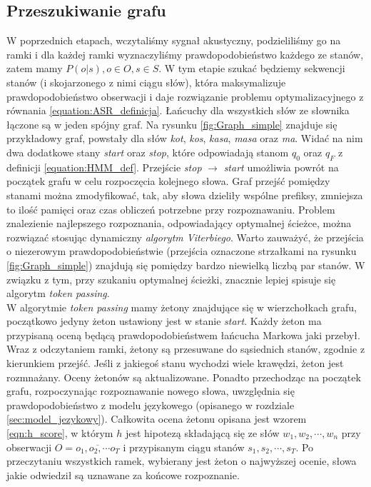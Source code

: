 \documentclass[a4paper,11pt,onecolumn,twoside,openright,titlepage]{article}
\begin{document}
	\subsection{Przeszukiwanie grafu}
		W poprzednich etapach, wczytaliśmy sygnał akustyczny, podzieliliśmy go na ramki i dla każdej ramki wyznaczyliśmy prawdopodobieństwo każdego ze stanów, zatem mamy $P(o|s), o \in O, s \in S$. W tym etapie szukać będziemy sekwencji stanów (i skojarzonego z nimi ciągu słów), która maksymalizuje  prawdopodobieństwo obserwacji i daje rozwiązanie problemu optymalizacyjnego z równania \ref{equation:ASR_definicja}. Łańcuchy dla wszystkich słów ze słownika łączone są w jeden spójny graf. Na rysunku \ref{fig:Graph_simple} znajduje się przykładowy graf, powstały dla słów \textit{kot}, \textit{kos}, \textit{kasa}, \textit{masa} oraz \textit{ma}. Widać na nim dwa dodatkowe stany \textit{start} oraz \textit{stop}, które odpowiadają stanom $q_0$ oraz $q_F$ z definicji \ref{equation:HMM_def}. Przejście \textit{stop} $\longrightarrow$ \textit{start} umożliwia powrót na początek grafu w celu rozpoczęcia kolejnego słowa. Graf przejść pomiędzy stanami można zmodyfikować, tak, aby słowa dzieliły wspólne prefiksy, zmniejsza to ilość pamięci oraz czas obliczeń potrzebne przy rozpoznawaniu. Problem znalezienie najlepszego rozpoznania, odpowiadający optymalnej ścieżce, można rozwiązać stosując dynamiczny \textit{algorytm Viterbiego}. Warto zauważyć, że przejścia o niezerowym prawdopodobieństwie (przejścia oznaczone strzałkami na rysunku \ref{fig:Graph_simple}) znajdują się pomiędzy bardzo niewielką liczbą par stanów. W związku z tym, przy szukaniu optymalnej ścieżki, znacznie lepiej spisuje się algorytm \textit{token passing}. 
		\\
		W algorytmie \textit{token passing} mamy żetony znajdujące się w wierzchołkach grafu, początkowo jedyny żeton ustawiony jest w stanie \textit{start}. Każdy żeton ma przypisaną oceną będącą prawdopodobieństwem łańcucha Markowa jaki przebył. Wraz z odczytaniem ramki, żetony są przesuwane do sąsiednich stanów, zgodnie z kierunkiem przejść. Jeśli z jakiegoś stanu wychodzi wiele krawędzi, żeton jest rozmnażany. Oceny żetonów są aktualizowane. Ponadto przechodząc na początek grafu, rozpoczynając rozpoznawanie nowego słowa, uwzględnia się prawdopodobieństwo z modelu językowego (opisanego w rozdziale \ref{sec:model_jezykowy}). Całkowita ocena żetonu opisana jest wzorem \ref{eqn:h_score}, w którym $h$ jest hipotezą składającą się ze słów $w_1,w_2,\cdots, w_n$ przy obserwacji  $O=\overline{o_1,o_2,\cdots o_T}$ i przypisanym ciągu stanów $s_1,s_2,\cdots,s_T$. Po przeczytaniu wszystkich ramek, wybierany jest żeton o najwyższej ocenie, słowa jakie odwiedził są uznawane za końcowe rozpoznanie.
		
\end{document}
